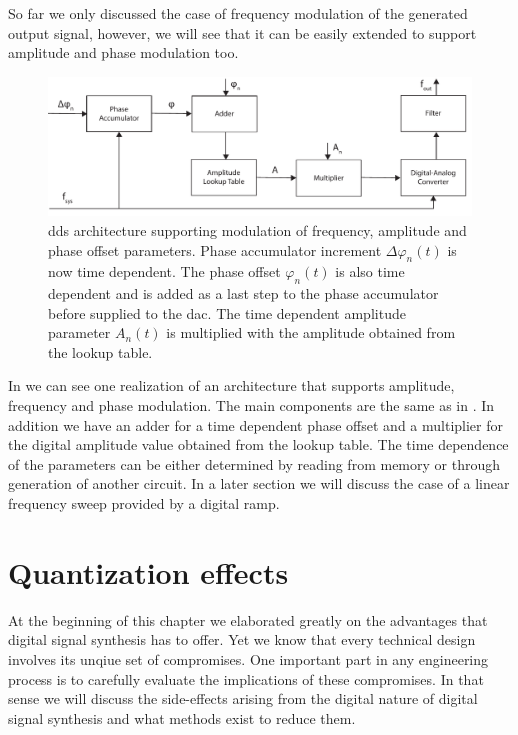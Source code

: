 So far we only discussed the case of frequency modulation of the generated
output signal, however, we will see that it can be easily extended to support
amplitude and phase modulation too.
\begin{figure}[htb]
  \centering
  \includegraphics[width=\textwidth]
  {../figure/digital-signal-synthesis/modulation-architecture.pdf}
  \caption{\gls{dds} architecture supporting modulation of frequency,
    amplitude and phase offset parameters. Phase accumulator increment
    $\Delta\varphi_n(t)$ is now time dependent. The phase offset $\varphi_n(t)$
    is also time dependent and is added as a last step to the phase
    accumulator before supplied to the \gls{dac}. The time dependent amplitude
    parameter $A_n(t)$ is multiplied with the amplitude obtained from the
    lookup table.
  }\label{fig:dds_modulation_architecture}
\end{figure}
In  we can see one realization of an
architecture that supports amplitude, frequency and phase modulation. The main
components are the same as in . In addition
we have an adder for a time dependent phase offset and a multiplier for the
digital amplitude value obtained from the lookup table. The time dependence
of the parameters can be either determined by reading from memory or through
generation of another circuit. In a later section we will discuss the case of
a linear frequency sweep provided by a digital ramp.

\section{Quantization effects}

At the beginning of this chapter we elaborated greatly on the advantages that
digital signal synthesis has to offer. Yet we know that every technical design
involves its unqiue set of compromises. One important part in any engineering
process is to carefully evaluate the implications of these compromises. In
that sense we will discuss the side-effects arising from the digital nature of
digital signal synthesis and what methods exist to reduce them.

